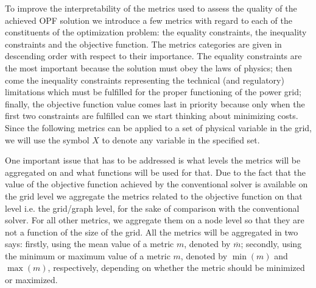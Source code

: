 To improve the interpretability of the metrics used to assess the quality of the achieved OPF solution
we introduce a few metrics with regard to each of the constituents of the optimization problem:
the equality constraints, the inequality constraints and the objective function.
The metrics categories are given in descending order with respect to their importance.
The equality constraints are the most important because the solution must obey the laws of physics;
then come the inequality constraints representing the technical (and regulatory) limitations
which must be fulfilled for the proper functioning of the power grid;
finally, the objective function value comes last in priority because only when the
first two constraints are fulfilled can we start thinking about minimizing costs.
Since the following metrics can be applied to a set of physical variable in the grid,
we will use the symbol $X$ to denote any variable in the specified set.


One important issue that has to be addressed is what levels the metrics will be aggregated on and
what functions will be used for that.
Due to the fact that the value of the objective function achieved by the conventional solver is available
on the grid level we aggregate the metrics related to the objective function on that level i.e. the
grid/graph level, for the sake of comparison with the conventional solver.
For all other metrics, we aggregate them on a node level so that they are not a function of the size of
the grid.
All the metrics will be aggregated in two says: firstly, using the mean value of a metric $m$, denoted
by $\overline{m}$; secondly, using the minimum or maximum value of a metric $m$, denoted
by $\min\left( m \right)$ and $\max\left( m \right)$, respectively, depending on whether the metric
should be minimized or maximized.
